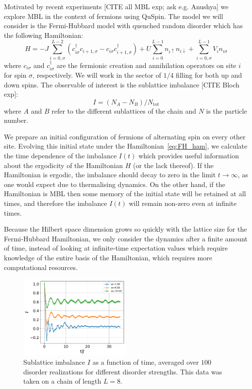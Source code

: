 \documentclass{SciPost}
\newcommand\0{\scalebox{-1}[1]{0}}
\begin{document}
Motivated by recent experiments [CITE all MBL exp; ask e.g. Anushya] we explore MBL in the context of fermions using QuSpin. The model we will consider is the Fermi-Hubbard model with quenched random disorder which has the following Hamiltonian:
\begin{equation}
	H = -J\sum_{i=0,\sigma}^{L-2} \left(c^\dagger_{i\sigma}c_{i+1,\sigma} - c_{i\sigma}c^\dagger_{i+1,\sigma}\right) +U\sum_{i=0}^{L-1} n_{i\uparrow }n_{i\downarrow } + \sum_{i=0,\sigma}^{L-1} V_i n_{i\sigma}\label{eq:FH_ham}
\end{equation}
where $c_{i\sigma }$ and $c^\dagger_{i\sigma }$ are the fermionic creation and annihilation operators on site $i$ for spin $\sigma$, respectively. We will work in the sector of $1/4$ filling for both up and down spins. The observable of interest is the sublattice imbalance [CITE Bloch exp]:
\begin{equation}
	I = (N_A-N_B)/N_\mathrm{tot}
\end{equation}
where $A$ and $B$ refer to the different sublattices of the chain and $N$ is the particle number.

We prepare an initial configuration of fermions of alternating spin on every other site. Evolving this initial state under the Hamiltonian~\eqref{eq:FH_ham}, we calculate the time dependence of the imbalance $I(t)$ which provides useful information about the ergodicity of the Hamiltonian $H$ (or the lack thereof). If the Hamiltonian is ergodic, the imbalance should decay to zero in the limit $t\rightarrow\infty$, as one would expect due to thermalising dynamics. On the other hand, if the Hamiltonian is MBL then some memory of the initial state will be retained at all times, and therefore the imbalance $I(t)$ will remain non-zero even at infinite times.

Because the Hilbert space dimension grows so quickly with the lattice size for the Fermi-Hubbard Hamiltonian, we only consider the dynamics after a finite amount of time, instead of looking at infinite-time expectation values which require knowledge of the entire basis of the Hamiltonian, which requires more computational resources. 

\begin{figure}[t!]
	\centering
	\includegraphics[width=0.5\textwidth]{fermion_MBL.pdf}
	\caption{\label{fig:MBL} Sublattice imbalance $I$ as a function of time, averaged over $100$ disorder realizations for different disorder strengths. This data was taken on a chain of length $L=8$.}
\end{figure}
\end{document}
